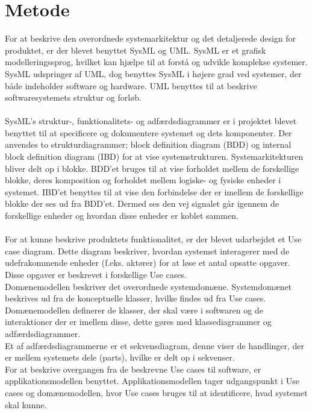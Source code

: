 \section{Metode}
\cite{SysML} For at beskrive den overordnede systemarkitektur og det detaljerede design for produktet, er der blevet benyttet SysML og UML. SysML er et grafisk modelleringssprog, hvilket kan hjælpe til at forstå og udvikle komplekse systemer. SysML udspringer af UML, dog benyttes SysML i højere grad ved systemer, der både indeholder software og hardware. UML benyttes til at beskrive softwaresystemets struktur og forløb. \cite{uml}
\\
\\
SysML’s struktur-, funktionalitets- og adfærdsdiagrammer er i projektet blevet benyttet til at specificere og dokumentere systemet og dets komponenter. Der anvendes to strukturdiagrammer; block definition diagram (BDD) og internal block definition diagram (IBD) for at vise systemstrukturen. Systemarkitekturen bliver delt op i blokke. BDD'et bruges til at vise forholdet mellem de forskellige blokke, deres komposition og forholdet mellem logiske- og fysiske enheder i systemet. IBD'et benyttes til at vise den forbindelse der er imellem de forskellige blokke der ses ud fra BDD'et. Dermed ses den vej signalet går igennem de forskellige enheder og hvordan disse enheder er koblet sammen.\\
\\ 
For at kunne beskrive produktets funktionalitet, er der blevet udarbejdet et Use case diagram. Dette diagram beskriver, hvordan systemet interagerer med de udefrakommende enheder (f.eks. aktører) for at løse et antal opsatte opgaver. Disse opgaver er beskrevet i forskellige Use cases. \\
Domænemodellen beskriver det overordnede systemdomæne. Systemdomænet beskrives ud fra de konceptuelle klasser, hvilke findes ud fra Use cases. Domænemodellen definerer de klasser, der skal være i softwaren og de interaktioner der er imellem disse, dette gøres med klassediagrammer og adfærdsdiagrammer.\\
Et af adfærdsdiagrammerne er et sekvensdiagram, denne viser de handlinger, der er mellem systemets dele (parts), hvilke er delt op i sekvenser.\\
For at beskrive overgangen fra de beskrevne Use cases til software, er applikationsmodellen benyttet. Applikationsmodellen tager udgangspunkt i Use cases og domænemodellen, hvor Use cases bruges til at identificere, hvad systemet skal kunne. \\
